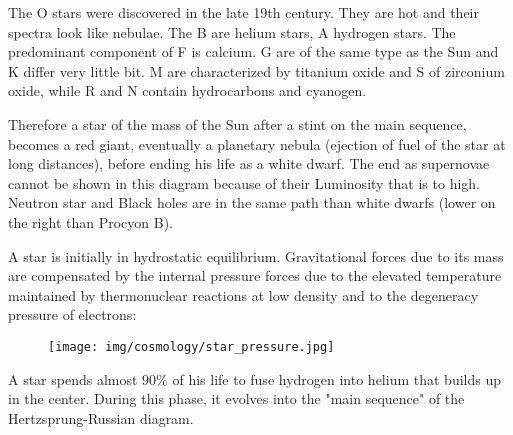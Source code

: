 	The O stars were discovered in the late 19th century. They are hot and their spectra look like nebulae. The B are helium stars, A hydrogen stars. The predominant component of F is calcium. G are of the same type as the Sun and K differ very little bit. M are characterized by titanium oxide and S of zirconium oxide, while R and N contain hydrocarbons and cyanogen.
	
	Therefore a star of the mass of the Sun after a stint on the main sequence, becomes a red giant, eventually a planetary nebula (ejection of fuel of the star at long distances), before ending his life as a white dwarf. The end as supernovae cannot be shown in this diagram because of their Luminosity that is to high. Neutron star and Black holes are in the same path than white dwarfs (lower on the right than Procyon B).
	
	A star is initially in hydrostatic equilibrium. Gravitational forces due to its mass are compensated by the internal pressure forces due to the elevated temperature maintained by thermonuclear reactions at low density and to the degeneracy pressure of electrons: 
	\begin{figure}[H]
		\begin{center}
		\texttt{[image: img/cosmology/star\_pressure.jpg]}
		\end{center}	
	\end{figure}	
	A star spends almost $90\%$ of his life to fuse hydrogen into helium that builds up in the center. During this phase, it evolves into the "main sequence" of the Hertzsprung-Russian diagram.
	
